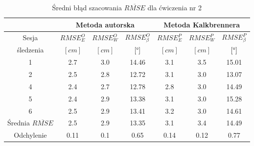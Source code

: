 
\begin{table}[!htp]
	\caption{Średni błąd szacowania $\overline{RMSE}$ dla ćwiczenia nr 2}
	\label{tab:experiments:sec:avg}
	\noindent
	\tiny
	\centering
	\begin{tabular}{|c|c|c|c|c|c|c|}
		\hline 
		& \multicolumn{3}{c|}{Metoda autorska} & \multicolumn{3}{c|}{Metoda Kalkbrennera}  \\ 
		\hline 
		Sesja                      & $RMSE^O_E$ & $RMSE^O_W$ & $RMSE^O_\beta$ & $RMSE^P_E$ & $RMSE^P_W$ & $RMSE^P_\beta$ \\
		śledzenia                 & $[cm]$     & $[cm]$     & $[\degree]$    & $[cm]$     & $[cm]$     & $[\degree]$    \\	
		\hline
		1                          & 2.7        & 3.0        & 14.46          & 3.1        & 3.5        & 15.01          \\
		2                          & 2.5        & 2.8        & 12.72          & 3.1        & 3.0        & 13.07          \\
		4                          & 2.4        & 2.7        & 12.78          & 2.8        & 3.0        & 14.49          \\
		5                          & 2.4        & 2.9        & 13.38          & 3.1        & 3.0        & 15.28          \\
		6                          & 2.5        & 2.9        & 13.41          & 3.2        & 3.0        & 14.61          \\
		\hline
		Średnia $\overline{RMSE}$ & 2.5        & 2.9        & 13.35          & 3.1        & 3.4        & 14.49          \\
		Odchylenie                 & 0.11       & 0.1        & 0.65           & 0.14       & 0.12       & 0.77           \\
		\hline
	\end{tabular} 
								
\end{table} 

